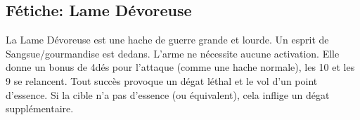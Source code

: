 \documentclass[oneside,12pt]{book}
\begin{document}
\begin{flushleft}
\subsection{Fétiche: Lame Dévoreuse}
\label{devoreuse}
La Lame Dévoreuse est une hache de guerre grande et lourde. Un esprit de Sangsue/gourmandise est dedans. L'arme ne nécessite aucune activation. Elle donne un bonus de 4dés pour l'attaque (comme une hache normale), les 10 et les 9 se relancent. Tout succès provoque un dégat léthal et le vol d'un point d'essence. Si la cible n'a pas d'essence (ou équivalent), cela inflige un dégat supplémentaire.    

\end{flushleft}
\end{document}
